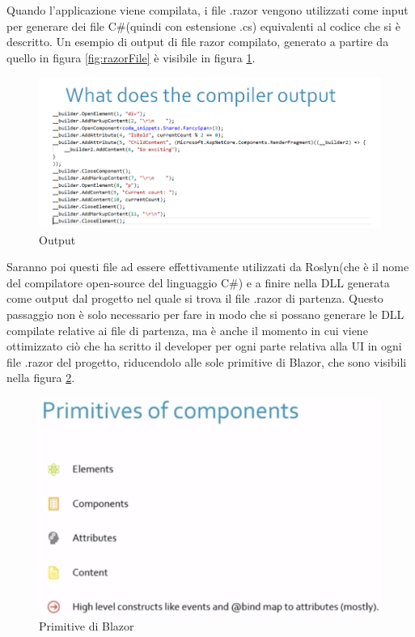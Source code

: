 Quando l'applicazione viene compilata, i file .razor vengono utilizzati come input per generare dei file C\#(quindi con estensione .cs) equivalenti al codice che si \`e descritto\cite{ryanNowakNDCSydney}.
Un esempio di output di file razor compilato, generato a partire da quello in figura \ref{fig:razorFile} \`e visibile in figura \ref{fig:compiledRazorFile}.
\begin{figure}[H]
	\centerline{\includegraphics[scale=0.55]{figure/RazorFileCompiled.PNG}}
	\caption{Output}
	\label{fig:compiledRazorFile}
\end{figure}

Saranno poi questi file ad essere effettivamente utilizzati da Roslyn(che \`e il nome del compilatore open-source del linguaggio C\#) e a finire nella DLL generata come output dal progetto nel quale si trova il file .razor di partenza.
Questo passaggio non \`e solo necessario per fare in modo che si possano generare le DLL compilate relative ai file di partenza, ma \`e anche il momento in cui viene ottimizzato ci\`o che ha scritto il developer per ogni parte relativa alla UI in ogni file .razor del progetto, riducendolo alle sole primitive di Blazor, che sono visibili nella figura \ref{fig:BlazorPrimitives}.

\begin{figure}[H]
	\centerline{\includegraphics[scale=0.7]{figure/BlazorPrimitives.PNG}}
	\caption{Primitive di Blazor}
	\label{fig:BlazorPrimitives}
\end{figure}

